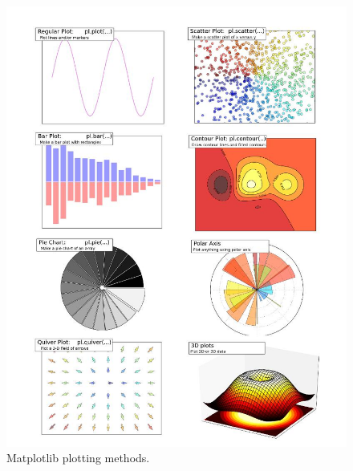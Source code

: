 \documentclass[aps,letterpaper,10pt]{revtex4}
\begin{document}
\begin{figure}[h]
\centering
\includegraphics[width=1.0\textwidth]{img/matplotlib_all.jpg}
\caption{Matplotlib plotting methods.}\label{fig:3}
\end{figure}
\end{document}
